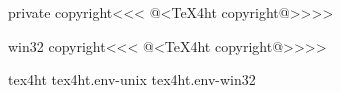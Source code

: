 \documentclass{article}
\begin{document}
\<private copyright\><<<
@<TeX4ht copyright@>>>>

\<win32 copyright\><<<
@<TeX4ht copyright@>>>>


\OutputCode\<tex4ht\>
\OutputCodE\<tex4ht.env-unix\>
\OutputCodE\<tex4ht.env-win32\>
\end{document}
